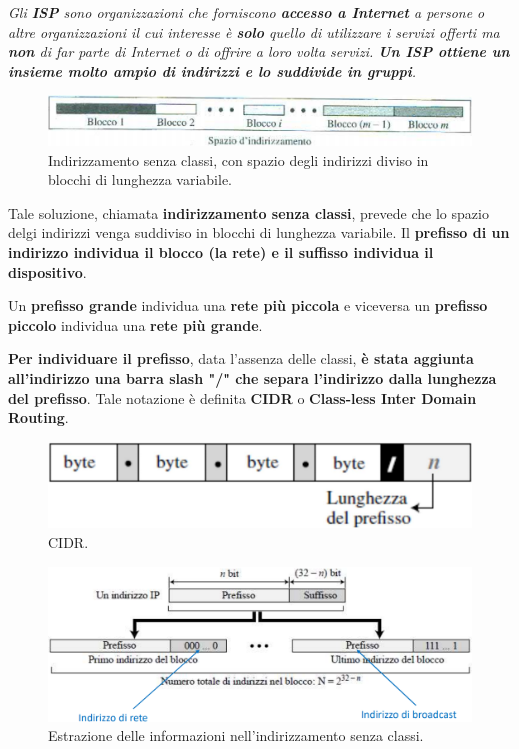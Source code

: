 \documentclass[11pt,a4paper,oneside]{book}
\theoremstyle{definition}
\begin{document}
\begin{flushleft}
	\textit{Gli \textbf{ISP} sono organizzazioni che forniscono \textbf{accesso a Internet} a persone o altre organizzazioni il cui interesse è \textbf{solo} quello di utilizzare i servizi offerti ma \textbf{non} di far parte di Internet o di offrire a loro volta servizi. \textbf{Un ISP ottiene un insieme molto ampio di indirizzi e lo suddivide in gruppi}.}
\end{flushleft}

\begin{figure}[!h]
	\includegraphics[scale=0.3]{Immagini/Ip_classless.png}
	\centering
	\caption{Indirizzamento senza classi, con spazio degli indirizzi diviso in blocchi di lunghezza variabile.}
\end{figure}

Tale soluzione, chiamata \textbf{indirizzamento senza classi}, prevede che lo spazio delgi indirizzi venga suddiviso in blocchi di lunghezza variabile. Il \textbf{prefisso di un indirizzo individua il blocco (la rete) e il suffisso individua il dispositivo}.

Un \textbf{prefisso grande} individua una \textbf{rete più piccola} e viceversa un \textbf{prefisso piccolo} individua una \textbf{rete più grande}.

\textbf{Per individuare il prefisso}, data l'assenza delle classi, \textbf{è stata aggiunta all'indirizzo una barra slash "/" che separa l'indirizzo dalla lunghezza del prefisso}. Tale notazione è definita \textbf{CIDR} o \textbf{Class-less Inter Domain Routing}.

\begin{figure}[!h]
	\includegraphics[scale=0.2]{Immagini/Ip_cidr.png}
	\centering
	\caption{CIDR.}
\end{figure}

\pagebreak

\begin{figure}[!h]
	\includegraphics[scale=0.3]{Immagini/Ip_inf_ex.png}
	\centering
	\caption{Estrazione delle informazioni nell'indirizzamento senza classi.}
\end{figure}
\end{document}
